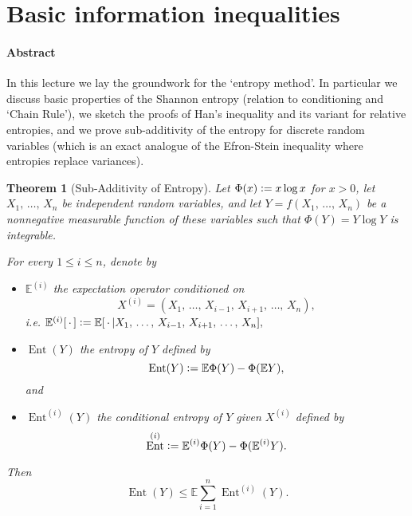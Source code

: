 \documentclass{amsproc}
\newtheorem{theorem}{Theorem}
\newcommand{\defeq}{\vcentcolon=} %
\newcommand{\E}{\mathbb{E}} %
\DeclareMathOperator{\Ent}{Ent} %
\begin{document}

\section{Basic information inequalities}
\label{sec:bas_inf_ineq}
\paragraph{\textbf{Abstract}}
	In this lecture we lay the groundwork for the `entropy method'.
	In particular we discuss basic properties of the Shannon entropy (relation to conditioning and `Chain Rule'),
	we sketch the proofs of Han's inequality and its variant for relative entropies,
	and we prove sub-additivity of the entropy for discrete random variables
	(which is an exact analogue of the Efron-Stein inequality where entropies replace variances).

\begin{theorem}[Sub-Additivity of Entropy]
\label{thm:sub_add_entropy}
	Let $\Phi(x) \defeq x\log x$ for $x>0$, let $X_1,\,\dots,\,X_n$ be independent random variables, and
	let $Y = f(X_1,\,\dots,\,X_n)$ be a nonnegative measurable function of these variables such that $\Phi(Y) = Y\log Y$ is integrable.

	For every $1\leq i \leq n$, denote by 
	\begin{itemize}
		\item	$\E^{(i)}$ the expectation operator conditioned on $$X^{(i)} = (X_1,\,\dots,\,X_{i-1},\,X_{i+1},\,\dots,\,X_n),$$
			i.e. $\E^{(i)} [\,\cdot\,] \defeq \E[\,\cdot\, | X_1,\,\dots,\,X_{i-1},\,X_{i+1},\,\dots,\,X_n],$
		\item	$\Ent (Y)$ the \emph{entropy} of $Y$ defined by $$\Ent (Y) \defeq \E\Phi (Y) - \Phi(\E Y),$$ and
		\item	$\Ent^{(i)} (Y)$ the \emph{conditional entropy} of $Y$ given $X^{(i)}$
			defined by $$\Ent^{(i)} \defeq \E^{(i)}\Phi (Y) - \Phi(\E^{(i)} Y).$$
	\end{itemize}

	Then $$\Ent (Y) \leq \E \sum_{i=1}^n \Ent^{(i)} (Y).$$
\end{theorem}
\end{document}
